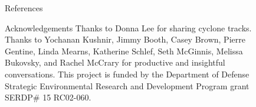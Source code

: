 \documentclass[serif,mathserif,final]{beamer}
\begin{document}
\begin{frame}{}
  \begin{columns}[t]

    \begin{column}{0.24\linewidth}

        
        
        

    \end{column}%

    \begin{column}{0.22\linewidth}
        
        

    \end{column}%

    \begin{column}{0.22\linewidth}

      

    \end{column}%


    \begin{column}{0.22\linewidth}

      \begin{block}{References}
          \renewcommand*{\bibfont}{\footnotesize}
          \printbibliography[heading=none]
      \end{block}

      \begin{block}{Acknowledgements}
          Thanks to Donna Lee for sharing cyclone tracks.
          Thanks to Yochanan Kushnir, Jimmy Booth, Casey Brown, Pierre Gentine, Linda Mearns, Katherine Schlef, Seth McGinnis, Melissa Bukovsky, and Rachel McCrary  for productive and insightful conversations.
          This project is funded by the Department of Defense Strategic Environmental Research and Development Program grant SERDP\# 15 RC02-060.
      \end{block}

    \end{column}%

  \end{columns}
\end{frame}
\end{document}
